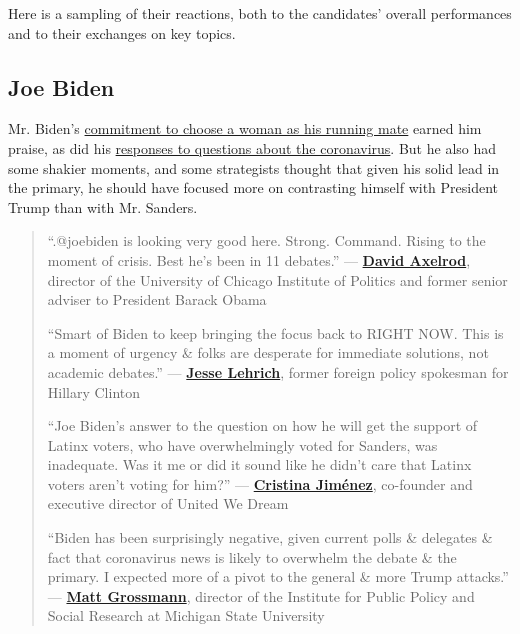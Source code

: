 Here is a sampling of their reactions, both to the candidates' overall
performances and to their exchanges on key topics.

\hypertarget{joe-biden}{%
\subsection{Joe Biden}\label{joe-biden}}

Mr. Biden's
\href{https://www.nytimes3xbfgragh.onion/2020/03/15/us/politics/joe-biden-female-vice-president.html}{commitment
to choose a woman as his running mate} earned him praise, as did his
\href{https://www.nytimes3xbfgragh.onion/video/us/politics/100000007035872/biden-pandemic.html}{responses
to questions about the coronavirus}. But he also had some shakier
moments, and some strategists thought that given his solid lead in the
primary, he should have focused more on contrasting himself with
President Trump than with Mr. Sanders.

\begin{quote}
``.@joebiden is looking very good here. Strong. Command. Rising to the
moment of crisis. Best he's been in 11 debates.'' ---
\textbf{\href{https://twitter.com/davidaxelrod/status/1239347201995874309}{David
Axelrod}}, director of the University of Chicago Institute of Politics
and former senior adviser to President Barack Obama

``Smart of Biden to keep bringing the focus back to RIGHT NOW. This is a
moment of urgency \& folks are desperate for immediate solutions, not
academic debates.'' ---
\textbf{\href{https://twitter.com/JesseLehrich/status/1239348905965498369}{Jesse
Lehrich}}, former foreign policy spokesman for Hillary Clinton

``Joe Biden's answer to the question on how he will get the support of
Latinx voters, who have overwhelmingly voted for Sanders, was
inadequate. Was it me or did it sound like he didn't care that Latinx
voters aren't voting for him?'' ---
\textbf{\href{https://twitter.com/CrisAlexJimenez/status/1239372196092489730}{Cristina
Jiménez}}, co-founder and executive director of United We Dream

``Biden has been surprisingly negative, given current polls \& delegates
\& fact that coronavirus news is likely to overwhelm the debate \& the
primary. I expected more of a pivot to the general \& more Trump
attacks.'' ---
\textbf{\href{https://twitter.com/MattGrossmann/status/1239362292283826176}{Matt
Grossmann}}, director of the Institute for Public Policy and Social
Research at Michigan State University
\end{quote}

